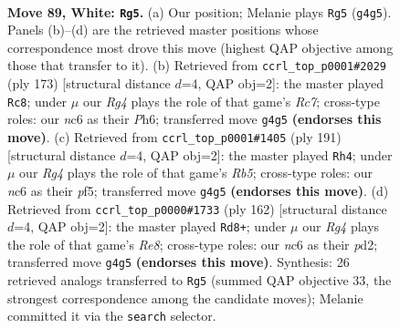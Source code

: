 \documentclass[11pt]{article}
\begin{document}
\clearpage

\begin{figure}[p]\centering
\begin{subfigure}{0.46\textwidth}\centering
\resizebox{\linewidth}{!}{%
\newchessgame
\chessboard[
  setfen={8/5k2/P1n5/8/6R1/7r/5K2/8 w - - 5 89},
  showmover=false,
  pgfstyle=straightmove, color=movearrow, markmove={g4-g5}
]}
\caption{}
\end{subfigure}\hfill
\begin{subfigure}{0.46\textwidth}\centering
\resizebox{\linewidth}{!}{%
\newchessgame
\chessboard[
  setfen={8/8/7p/4k2P/R7/5K2/2r5/8 b - - 2 87},
  showmover=false,
  pgfstyle=straightmove, color=movearrow, markmove={c2-c8}
]}
\caption{}
\end{subfigure}
\\[4pt]
\begin{subfigure}{0.46\textwidth}\centering
\resizebox{\linewidth}{!}{%
\newchessgame
\chessboard[
  setfen={8/R7/5p1k/5P2/1r6/5K2/8/8 b - - 5 96},
  showmover=false,
  pgfstyle=straightmove, color=movearrow, markmove={b4-h4}
]}
\caption{}
\end{subfigure}\hfill
\begin{subfigure}{0.46\textwidth}\centering
\resizebox{\linewidth}{!}{%
\newchessgame
\chessboard[
  setfen={4R3/2r5/8/8/1P1k4/8/1K1p4/8 w - - 0 82},
  showmover=false,
  pgfstyle=straightmove, color=movearrow, markmove={e8-d8}
]}
\caption{}
\end{subfigure}
\caption{\textbf{Move 89, White: \texttt{Rg5}.} (a) Our position; Melanie plays \texttt{Rg5} (\texttt{g4g5}). Panels (b)--(d) are the retrieved master positions whose correspondence most drove this move (highest QAP objective among those that transfer to it). (b) Retrieved from \texttt{ccrl\_top\_p0001\#2029} (ply 173) [structural distance $d$=4, QAP obj=2]: the master played \texttt{Rc8}; under $\mu$ our \emph{Rg4} plays the role of that game's \emph{Rc7}; cross-type roles: our \emph{n}c6 as their \emph{P}h6; transferred move \texttt{g4g5} \textbf{(endorses this move)}. (c) Retrieved from \texttt{ccrl\_top\_p0001\#1405} (ply 191) [structural distance $d$=4, QAP obj=2]: the master played \texttt{Rh4}; under $\mu$ our \emph{Rg4} plays the role of that game's \emph{Rb5}; cross-type roles: our \emph{n}c6 as their \emph{p}f5; transferred move \texttt{g4g5} \textbf{(endorses this move)}. (d) Retrieved from \texttt{ccrl\_top\_p0000\#1733} (ply 162) [structural distance $d$=4, QAP obj=2]: the master played \texttt{Rd8+}; under $\mu$ our \emph{Rg4} plays the role of that game's \emph{Re8}; cross-type roles: our \emph{n}c6 as their \emph{p}d2; transferred move \texttt{g4g5} \textbf{(endorses this move)}. Synthesis: 26 retrieved analogs transferred to \texttt{Rg5} (summed QAP objective 33, the strongest correspondence among the candidate moves); Melanie committed it via the \texttt{search} selector.}
\label{fig:thought-m176}
\end{figure}
\end{document}

